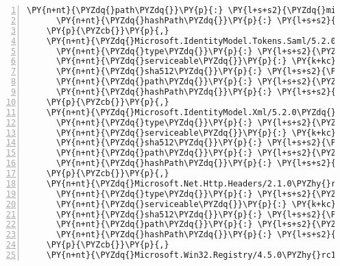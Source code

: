 \begin{Verbatim}[commandchars=\\\{\},numbers=left,firstnumber=1,stepnumber=1,numberblanklines=0]
      \PY{n+nt}{\PYZdq{}path\PYZdq{}}\PY{p}{:} \PY{l+s+s2}{\PYZdq{}microsoft.identitymodel.tokens/5.2.0\PYZdq{}}\PY{p}{,}
      \PY{n+nt}{\PYZdq{}hashPath\PYZdq{}}\PY{p}{:} \PY{l+s+s2}{\PYZdq{}microsoft.identitymodel.tokens.5.2.0.nupkg.sha512\PYZdq{}}
    \PY{p}{\PYZcb{}}\PY{p}{,}
    \PY{n+nt}{\PYZdq{}Microsoft.IdentityModel.Tokens.Saml/5.2.0\PYZdq{}}\PY{p}{:} \PY{p}{\PYZob{}}
      \PY{n+nt}{\PYZdq{}type\PYZdq{}}\PY{p}{:} \PY{l+s+s2}{\PYZdq{}package\PYZdq{}}\PY{p}{,}
      \PY{n+nt}{\PYZdq{}serviceable\PYZdq{}}\PY{p}{:} \PY{k+kc}{true}\PY{p}{,}
      \PY{n+nt}{\PYZdq{}sha512\PYZdq{}}\PY{p}{:} \PY{l+s+s2}{\PYZdq{}sha512\PYZhy{}db9y9zHTxeVwTi91mqBu4u1h5tlseQxhXMlGBd7bousED/FcEuhRiVK1maXjoHyQTnYbFDGPvYKXxznDI5jBGQ==\PYZdq{}}\PY{p}{,}
      \PY{n+nt}{\PYZdq{}path\PYZdq{}}\PY{p}{:} \PY{l+s+s2}{\PYZdq{}microsoft.identitymodel.tokens.saml/5.2.0\PYZdq{}}\PY{p}{,}
      \PY{n+nt}{\PYZdq{}hashPath\PYZdq{}}\PY{p}{:} \PY{l+s+s2}{\PYZdq{}microsoft.identitymodel.tokens.saml.5.2.0.nupkg.sha512\PYZdq{}}
    \PY{p}{\PYZcb{}}\PY{p}{,}
    \PY{n+nt}{\PYZdq{}Microsoft.IdentityModel.Xml/5.2.0\PYZdq{}}\PY{p}{:} \PY{p}{\PYZob{}}
      \PY{n+nt}{\PYZdq{}type\PYZdq{}}\PY{p}{:} \PY{l+s+s2}{\PYZdq{}package\PYZdq{}}\PY{p}{,}
      \PY{n+nt}{\PYZdq{}serviceable\PYZdq{}}\PY{p}{:} \PY{k+kc}{true}\PY{p}{,}
      \PY{n+nt}{\PYZdq{}sha512\PYZdq{}}\PY{p}{:} \PY{l+s+s2}{\PYZdq{}sha512\PYZhy{}0WB90AfR16LT0ANCQTb+183yWrusPt4QK1F3f9eL59ZiDKeZLx2AeXgrkDUO+7kG55nCPqmeOUDjHDVK4gsRgA==\PYZdq{}}\PY{p}{,}
      \PY{n+nt}{\PYZdq{}path\PYZdq{}}\PY{p}{:} \PY{l+s+s2}{\PYZdq{}microsoft.identitymodel.xml/5.2.0\PYZdq{}}\PY{p}{,}
      \PY{n+nt}{\PYZdq{}hashPath\PYZdq{}}\PY{p}{:} \PY{l+s+s2}{\PYZdq{}microsoft.identitymodel.xml.5.2.0.nupkg.sha512\PYZdq{}}
    \PY{p}{\PYZcb{}}\PY{p}{,}
    \PY{n+nt}{\PYZdq{}Microsoft.Net.Http.Headers/2.1.0\PYZhy{}rc1\PYZhy{}final\PYZdq{}}\PY{p}{:} \PY{p}{\PYZob{}}
      \PY{n+nt}{\PYZdq{}type\PYZdq{}}\PY{p}{:} \PY{l+s+s2}{\PYZdq{}package\PYZdq{}}\PY{p}{,}
      \PY{n+nt}{\PYZdq{}serviceable\PYZdq{}}\PY{p}{:} \PY{k+kc}{true}\PY{p}{,}
      \PY{n+nt}{\PYZdq{}sha512\PYZdq{}}\PY{p}{:} \PY{l+s+s2}{\PYZdq{}sha512\PYZhy{}lR55j2P9mYj8OClYGTlaLeykFcKS5MGo3bL2a+PRn89yBz1/DQVr75rXv+5MH5T8N6ubSv7PvJyAmfpb0O3/pA==\PYZdq{}}\PY{p}{,}
      \PY{n+nt}{\PYZdq{}path\PYZdq{}}\PY{p}{:} \PY{l+s+s2}{\PYZdq{}microsoft.net.http.headers/2.1.0\PYZhy{}rc1\PYZhy{}final\PYZdq{}}\PY{p}{,}
      \PY{n+nt}{\PYZdq{}hashPath\PYZdq{}}\PY{p}{:} \PY{l+s+s2}{\PYZdq{}microsoft.net.http.headers.2.1.0\PYZhy{}rc1\PYZhy{}final.nupkg.sha512\PYZdq{}}
    \PY{p}{\PYZcb{}}\PY{p}{,}
    \PY{n+nt}{\PYZdq{}Microsoft.Win32.Registry/4.5.0\PYZhy{}rc1\PYZdq{}}\PY{p}{:} \PY{p}{\PYZob{}}

\end{Verbatim}
